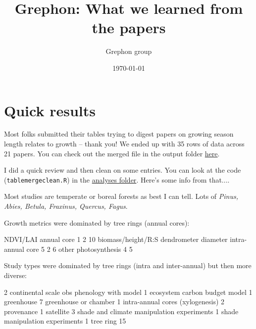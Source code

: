 \documentclass[11pt]{article}
\begin{document}
\renewcommand{\refname}{\CHead{}}

\title{Grephon: What we learned from the papers}
\date{\today}
\author{Grephon group} 
\maketitle

\tableofcontents

\section{Quick results}

Most folks submitted their tables trying to digest papers on growing season length relates to growth -- thank you! We ended up with 35 rows of data across 21 papers. You can check out the merged file in the output folder \href{https://github.com/lizzieinvancouver/grephon/tree/main/analyses}{here}.

I did a quick review and then clean on some entries. You can look at the code (\verb|tablemergeclean.R|) in the \href{https://github.com/lizzieinvancouver/grephon/tree/main/analyses}{analyses folder}. Here's some info from that....

Most studies are temperate or boreal forests as best I can tell. Lots of \emph{Pinus, Abies, Betula, Fraxinus, Quercus, Fagus}.

Growth metrics were dominated by tree rings (annual cores):
\begin{Schunk}
\begin{Soutput}
                                 NDVI/LAI          annual core 
                   1                    2                   10 
  biomass/height/R:S dendrometer diameter    intra-annual core 
                   5                    2                    6 
               other       photosynthesis 
                   4                    5 
\end{Soutput}
\end{Schunk}

\newpage
Study types were dominated by tree rings (intra and inter-annual) but then more diverse:
\begin{Schunk}
\begin{Soutput}
                                         2 
continental scale obs phenology with model 
                                         1 
             ecosystem carbon budget model 
                                         1 
                                greenhouse 
                                         7 
                     greenhouse or chamber 
                                         1 
          intra-annual cores (xylogenesis) 
                                         2 
                                provenance 
                                         1 
                                 satellite 
                                         3 
shade and climate manipulation experiments 
                                         1 
            shade manipulation experiments 
                                         1 
                                 tree ring 
                                        15 
\end{Soutput}
\end{Schunk}
\newpage
\end{document}
